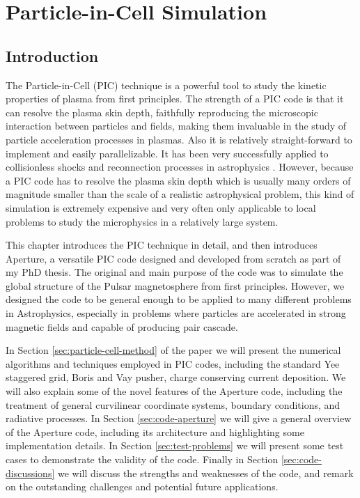 
\chapter{Particle-in-Cell Simulation}
\label{chap:pic}

\section{Introduction}
\label{sec:introduction}

The Particle-in-Cell (PIC) technique is a powerful tool to study the kinetic
properties of plasma from first principles. The strength of a PIC code is that
it can resolve the plasma skin depth, faithfully reproducing the microscopic
interaction between particles and fields, making them invaluable in the study of
particle acceleration processes in plasmas. Also it is relatively
straight-forward to implement and easily parallelizable. It has been very
successfully applied to collisionless shocks and reconnection processes in
astrophysics
. However, because a PIC code has to resolve the
plasma skin depth which is usually many orders of magnitude smaller than the
scale of a realistic astrophysical problem, this kind of simulation is extremely
expensive and very often only applicable to local problems to study the
microphysics in a relatively large system.

This chapter introduces the PIC technique in detail, and then introduces
Aperture, a versatile PIC code designed and developed from scratch as part of my
PhD thesis. The original and main purpose of the code was to simulate the global
structure of the Pulsar magnetosphere from first principles. However, we
designed the code to be general enough to be applied to many different problems
in Astrophysics, especially in problems where particles are accelerated in
strong magnetic fields and capable of producing pair cascade.

In Section \ref{sec:particle-cell-method} of the paper we will present the
numerical algorithms and techniques employed in PIC codes, including the
standard Yee staggered grid, Boris and Vay pusher, charge conserving current
deposition. We will also explain some of the novel features of the Aperture
code, including the treatment of general curvilinear coordinate systems,
boundary conditions, and radiative processes. In Section \ref{sec:code-aperture}
we will give a general overview of the Aperture code, including its architecture
and highlighting some implementation details. In Section \ref{sec:test-problems}
we will present some test cases to demonstrate the validity of the code. Finally
in Section \ref{sec:code-discussions} we will discuss the strengths and
weaknesses of the code, and remark on the outstanding challenges and potential
future applications.

